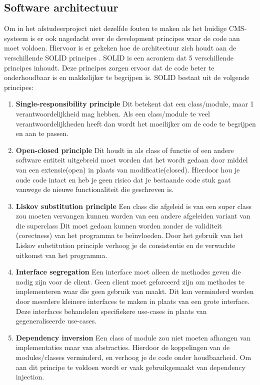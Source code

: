 \subsection{Software architectuur}
\label{subsecion:SoftwareArhitectuur}
Om in het afstudeerproject niet dezelfde fouten te maken als het huidige \gls{CMS}-systeem is er ook nagedacht over de development principes waar de code aan moet voldoen.
Hiervoor is er gekeken hoe de architectuur zich houdt aan de verschillende SOLID principes \parencite{SOLID}. 
SOLID is een acroniem dat 5 verschillende principes inhoudt.
Deze principes zorgen ervoor dat de code beter te onderhoudbaar is en makkelijker te begrijpen is.
SOLID bestaat uit de volgende principes:

\begin{enumerate}
    \item \textbf{Single-responsibility principle}
    Dit betekent dat een class\slash module, maar 1 verantwoordelijkheid mag hebben.
    Als een class\slash module te veel verantwoordelijkheden heeft dan wordt het moeilijker om de code te begrijpen en aan te passen.

    \item \textbf{Open-closed principle}
    Dit houdt in als class of functie of een andere software entiteit uitgebreid moet worden dat het wordt gedaan door middel van een extensie(open) in plaats van modificatie(closed).
    Hierdoor hou je oude code intact en heb je geen risico dat je bestaande code stuk gaat vanwege de nieuwe functionaliteit die geschreven is. 
        
    \item \textbf{Liskov substitution principle}
    Een class die afgeleid is van een super class zou moeten vervangen kunnen worden van een andere afgeleiden variant van die superclass
    Dit moet gedaan kunnen worden zonder de validiteit (corectness) van het programma te beïnvloeden.
    Door het gebruik van het Liskov substitution principle verhoog je de consistentie en de verwachte uitkomst van het programma.

    \item \textbf{Interface segregation} 
    Een interface moet alleen de methodes geven die nodig zijn voor de client. 
    Geen client moet geforceerd zijn om methodes te implementeren waar die geen gebruik van maakt.
    Dit kan verminderd worden door meerdere kleinere interfaces te maken in plaats van een grote interface.
    Deze interfaces behandelen specifiekere use-cases in plaats van gegeneraliseerde use-cases.
    \item \textbf{Dependency inversion} 
    Een class of module zou niet moeten afhangen van implementaties maar van abstracties.
    Hierdoor de koppelingen van de modules/classes verminderd, en verhoog je de code onder houdbaarheid.
    Om aan dit principe te voldoen wordt er vaak gebruikgemaakt van dependency injection.
\end{enumerate}

